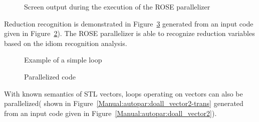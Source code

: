 \begin{figure}[htbp]
{\indent
  {\mySmallFontSize
    \begin{latexonly}
    
    \end{latexonly}
    \begin{htmlonly}
    
    \end{htmlonly}
  }
}
\caption{Screen output during the execution of the ROSE parallelizer}
\label{Manual:autopar:inner_only-output}
\end{figure}

Reduction recognition is demonstrated in Figure~\ref{Manual:autopar:reduction-trans} generated from  an input code given in
Figure~\ref{Manual:autopar:reduction}).
The ROSE parallelizer is able to recognize reduction variables based on the
idiom recognition analysis.

\lstset{language=C,basicstyle=\scriptsize,numbers=left}
\begin{figure}[htbp]
{\indent
  {\mySmallFontSize
    \begin{latexonly}
    
    \end{latexonly}
    \begin{htmlonly}
    
    \end{htmlonly}
  }
}
\caption{Example of a simple loop}
\label{Manual:autopar:reduction}
\end{figure}

\begin{figure}[htbp]
{\indent
  {\mySmallFontSize
    \begin{latexonly}
    
    \end{latexonly}
    \begin{htmlonly}
    
    \end{htmlonly}
  }
}
\caption{Parallelized code}
\label{Manual:autopar:reduction-trans}
\end{figure}

With known semantics of STL vectors, loops operating on vectors can also be parallelized( shown in Figure~\ref{Manual:autopar:doall_vector2-trans} generated from  an input code given in Figure~\ref{Manual:autopar:doall_vector2}).

